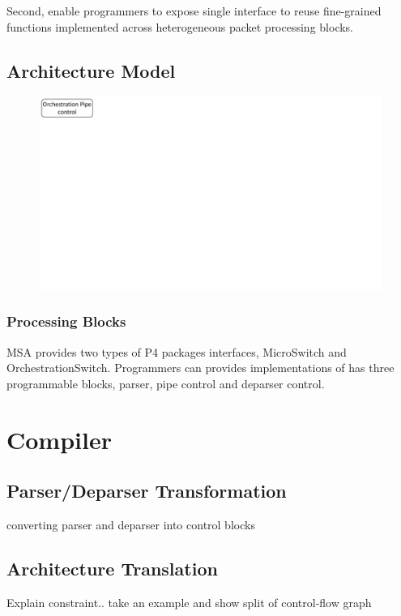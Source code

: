 \documentclass[10pt,sigconf,letterpaper,anonymous]{acmart}
\begin{document}
Second, enable programmers to expose single interface to reuse fine-grained functions implemented across heterogeneous packet processing blocks.

\subsection{Architecture Model}


\begin{figure}
 \includegraphics[trim=0 480 805 0,clip,scale=0.5]{micro-orchestration-pipeline}
\end{figure}

\subsubsection{Processing Blocks}
MSA provides two types of P4 packages interfaces, MicroSwitch and OrchestrationSwitch.
Programmers can provides implementations of 
has three programmable blocks, parser, pipe control and deparser control. 



\section{Compiler}

\subsection{Parser/Deparser Transformation}
converting parser and deparser into control blocks

\subsection{Architecture Translation}
Explain constraint.. take an example and show split of control-flow graph
\end{document}
